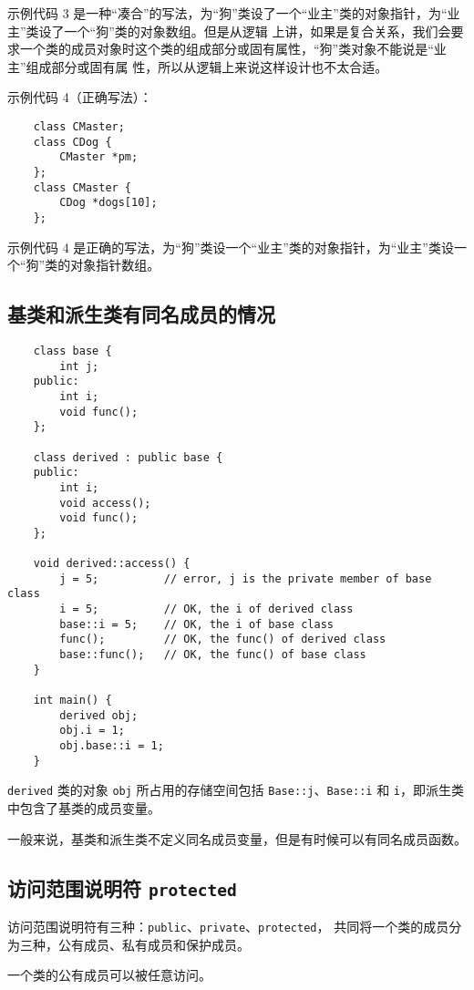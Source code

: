 \documentclass[UTF8]{ctexart}
\begin{document}
示例代码 3 是一种“凑合”的写法，为“狗”类设了一个“业主”类的对象指针，为“业主”类设了一个“狗”类的对象数组。但是从逻辑
上讲，如果是复合关系，我们会要求一个类的成员对象时这个类的组成部分或固有属性，“狗”类对象不能说是“业主”组成部分或固有属
性，所以从逻辑上来说这样设计也不太合适。

示例代码 4（正确写法）：
\begin{verbatim}
    class CMaster;
    class CDog {
        CMaster *pm;
    };
    class CMaster {
        CDog *dogs[10];
    };
\end{verbatim}

示例代码 4 是正确的写法，为“狗”类设一个“业主”类的对象指针，为“业主”类设一个“狗”类的对象指针数组。

\subsection{基类和派生类有同名成员的情况}
\begin{verbatim}
    class base {
        int j;
    public:
        int i;
        void func();
    };

    class derived : public base {
    public:
        int i;
        void access();
        void func();
    };

    void derived::access() {
        j = 5;          // error, j is the private member of base class
        i = 5;          // OK, the i of derived class
        base::i = 5;    // OK, the i of base class
        func();         // OK, the func() of derived class
        base::func();   // OK, the func() of base class
    }

    int main() {
        derived obj;
        obj.i = 1;
        obj.base::i = 1;
    }
\end{verbatim}

\texttt{derived} 类的对象 \texttt{obj} 所占用的存储空间包括 \texttt{Base::j}、\texttt{Base::i} 和
\texttt{i}，即派生类中包含了基类的成员变量。

一般来说，基类和派生类不定义同名成员变量，但是有时候可以有同名成员函数。

\subsection{访问范围说明符 \texttt{protected}}
访问范围说明符有三种：\texttt{public}、\texttt{private}、\texttt{protected}，
共同将一个类的成员分为三种，公有成员、私有成员和保护成员。

一个类的公有成员可以被任意访问。
\end{document}
